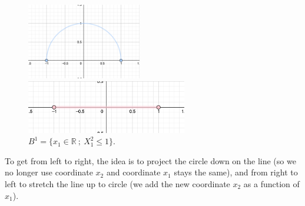 \documentclass[a4paper,11pt]{article}
\begin{document}
\begin{figure}[ht]
    \begin{minipage}{0.5\textwidth}
         \centering
         \includegraphics[width=50mm]{X_n1_2.png}
         \caption{$S_{+}^{1} = \{ (x_1, x_2)\in S^1 \ ; \ x_{2} \geq 0\}$.}
    \end{minipage}\hfill
    \begin{minipage}{0.5\textwidth}
         \centering
         \includegraphics[width=70mm]{Y_n1_2.png}
         \caption{$B^1 = \{ x_1 \in \mathbb{R} \ ; \ X_1^2  \leq 1\}$.}
    \end{minipage}\hfill
\end{figure}

To get from left to right, the idea is to project the circle down on the line (so we no longer use coordinate $x_2$ and coordinate $x_1$ stays the same), and from right to left to stretch the line up to circle (we add the new coordinate $x_2$ as a function of $x_1$). 
\end{document}
